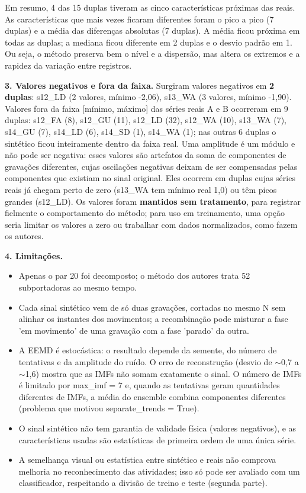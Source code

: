 Em resumo, 4 das 15 duplas tiveram as cinco características próximas das reais. As características que mais vezes ficaram diferentes foram o pico a pico (7 duplas) e a média das diferenças absolutas (7 duplas). A média ficou próxima em todas as duplas; a mediana ficou diferente em 2 duplas e o desvio padrão em 1. Ou seja, o método preserva bem o nível e a dispersão, mas altera os extremos e a rapidez da variação entre registros.

\textbf{3. Valores negativos e fora da faixa.} Surgiram valores negativos em \textbf{2 duplas}: s12\_LD (2 valores, mínimo -2,06), s13\_WA (3 valores, mínimo -1,90). Valores fora da faixa [mínimo, máximo] das séries reais A e B ocorreram em 9 duplas: s12\_FA (8), s12\_GU (11), s12\_LD (32), s12\_WA (10), s13\_WA (7), s14\_GU (7), s14\_LD (6), s14\_SD (1), s14\_WA (1); nas outras 6 duplas o sintético ficou inteiramente dentro da faixa real. Uma amplitude é um módulo e não pode ser negativa: esses valores são artefatos da soma de componentes de gravações diferentes, cujas oscilações negativas deixam de ser compensadas pelas componentes que existiam no sinal original. Eles ocorrem em duplas cujas séries reais já chegam perto de zero (s13\_WA tem mínimo real 1,0) ou têm picos grandes (s12\_LD). Os valores foram \textbf{mantidos sem tratamento}, para registrar fielmente o comportamento do método; para uso em treinamento, uma opção seria limitar os valores a zero ou trabalhar com dados normalizados, como fazem os autores.

\textbf{4. Limitações.}

\begin{itemize}
    \item Apenas o par 20 foi decomposto; o método dos autores trata 52 subportadoras ao mesmo tempo.
    \item Cada sinal sintético vem de só duas gravações, cortadas no mesmo N sem alinhar os instantes dos movimentos; a recombinação pode misturar a fase 'em movimento' de uma gravação com a fase 'parado' da outra.
    \item A EEMD é estocástica: o resultado depende da semente, do número de tentativas e da amplitude do ruído. O erro de reconstrução (desvio de $\sim$0,7 a $\sim$1,6) mostra que as IMFs não somam exatamente o sinal. O número de IMFs é limitado por max\_imf = 7 e, quando as tentativas geram quantidades diferentes de IMFs, a média do ensemble combina componentes diferentes (problema que motivou separate\_trends = True).
    \item O sinal sintético não tem garantia de validade física (valores negativos), e as características usadas são estatísticas de primeira ordem de uma única série.
    \item A semelhança visual ou estatística entre sintético e reais não comprova melhoria no reconhecimento das atividades; isso só pode ser avaliado com um classificador, respeitando a divisão de treino e teste (segunda parte).
\end{itemize}
